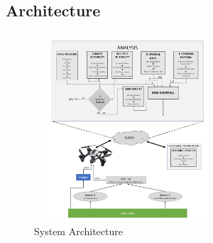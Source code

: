 \documentclass[conference]{IEEEtran}
\begin{document}
\subsection{Architecture}

\begin{figure}[htp]
    \centering
    \includegraphics[width=7cm,height=7cm]{architecture_ml.png}
    \caption{System Architecture}
    \label{sa}
\end{figure}
\end{document}
